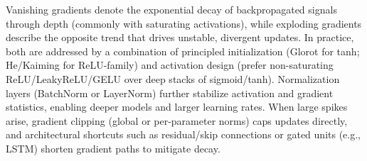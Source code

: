 Vanishing gradients denote the exponential decay of backpropagated signals through depth (commonly with saturating activations), while exploding gradients describe the opposite trend that drives unstable, divergent updates. In practice, both are addressed by a combination of principled initialization (Glorot for tanh; He/Kaiming for ReLU-family) and activation design (prefer non-saturating ReLU/LeakyReLU/GELU over deep stacks of sigmoid/tanh). Normalization layers (BatchNorm or LayerNorm) further stabilize activation and gradient statistics, enabling deeper models and larger learning rates. When large spikes arise, gradient clipping (global or per-parameter norms) caps updates directly, and architectural shortcuts such as residual/skip connections or gated units (e.g., LSTM) shorten gradient paths to mitigate decay.
